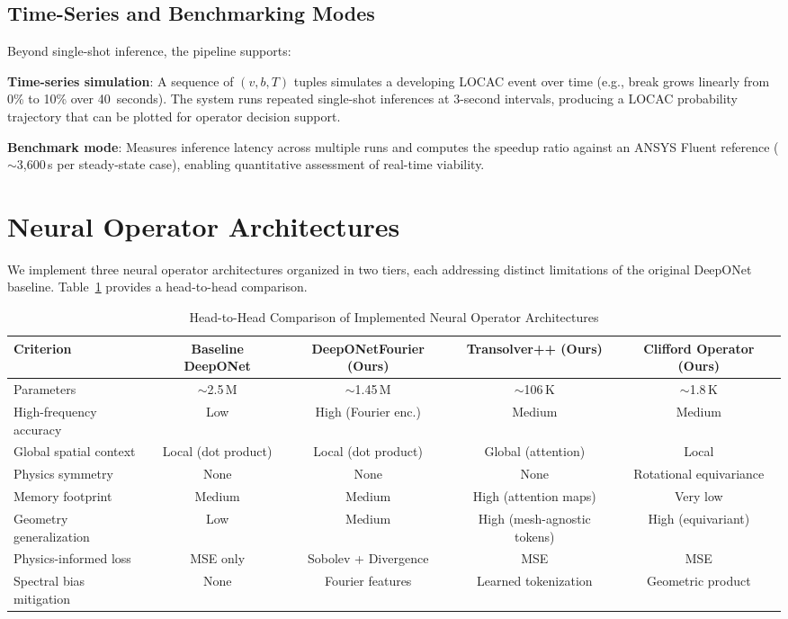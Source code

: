 \documentclass[conference]{IEEEtran}
\begin{document}
\subsection{Time-Series and Benchmarking Modes}

Beyond single-shot inference, the pipeline supports:

\textbf{Time-series simulation}: A sequence of $(v, b, T)$ tuples simulates a developing LOCAC event over time (e.g., break grows linearly from 0\% to 10\% over 40~seconds). The system runs repeated single-shot inferences at 3-second intervals, producing a LOCAC probability trajectory that can be plotted for operator decision support.

\textbf{Benchmark mode}: Measures inference latency across multiple runs and computes the speedup ratio against an ANSYS Fluent reference ($\sim$3,600\,s per steady-state case), enabling quantitative assessment of real-time viability.

\section{Neural Operator Architectures}
\label{sec:architectures}

We implement three neural operator architectures organized in two tiers, each addressing distinct limitations of the original DeepONet baseline. Table~\ref{tab:comparison} provides a head-to-head comparison.

\begin{table}[htbp]
\caption{Head-to-Head Comparison of Implemented Neural Operator Architectures}
\label{tab:comparison}
\centering
\begin{tabular}{lcccc}
\toprule
\textbf{Criterion} & \textbf{Baseline DeepONet} & \textbf{DeepONetFourier (Ours)} & \textbf{Transolver++ (Ours)} & \textbf{Clifford Operator (Ours)} \\
\midrule
Parameters & $\sim$2.5\,M & $\sim$1.45\,M & $\sim$106\,K & $\sim$1.8\,K \\
High-frequency accuracy & Low & High (Fourier enc.) & Medium & Medium \\
Global spatial context & Local (dot product) & Local (dot product) & Global (attention) & Local \\
Physics symmetry & None & None & None & Rotational equivariance \\
Memory footprint & Medium & Medium & High (attention maps) & Very low \\
Geometry generalization & Low & Medium & High (mesh-agnostic tokens) & High (equivariant) \\
Physics-informed loss & MSE only & Sobolev + Divergence & MSE & MSE \\
Spectral bias mitigation & None & Fourier features & Learned tokenization & Geometric product \\
\bottomrule
\end{tabular}
\end{table}
\end{document}

